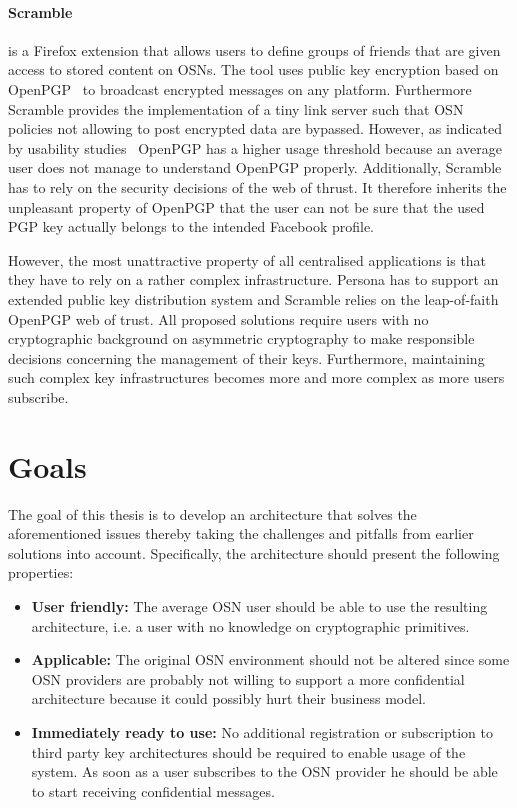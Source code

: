 \paragraph{Scramble~\cite{art:BeatoKW11}} is a Firefox extension that allows users to define groups of friends that are given access to stored content on OSNs. The tool uses public key encryption based on OpenPGP~\cite{rfc4880} to broadcast encrypted messages on any platform. Furthermore Scramble provides the implementation of a tiny link server such that OSN policies not allowing to post encrypted data are bypassed. However, as indicated by usability studies~\cite{art:WhittenT99} OpenPGP has a higher usage threshold because an average user does not manage to understand OpenPGP properly. Additionally, Scramble has to rely on the security decisions of the web of thrust. It therefore inherits the unpleasant property of OpenPGP that the user can not be sure that the used PGP key actually belongs to the intended Facebook profile.

However, the most unattractive property of all centralised applications is that they have to rely on a rather complex infrastructure. Persona has to support an extended public key distribution system and Scramble relies on the leap-of-faith OpenPGP web of trust. All proposed solutions require users with no cryptographic background on asymmetric cryptography to make responsible decisions concerning the management of their keys. Furthermore, maintaining such complex key infrastructures becomes more and more complex as more users subscribe.

\section{Goals}
\label{sec:goals_of_this_thesis}
The goal of this thesis is to develop an architecture that solves the aforementioned issues thereby taking the challenges and pitfalls from earlier solutions into account. Specifically, the architecture should present the following properties:
\begin{itemize}
 \item \textbf{User friendly:} The average OSN user should be able to use the resulting architecture, i.e. a user with no knowledge on cryptographic primitives.
 \item \textbf{Applicable:} The original OSN environment should not be altered since some OSN providers are probably not willing to support a more confidential architecture because it could possibly hurt their business model.
 \item \textbf{Immediately ready to use:} No additional registration or subscription to third party key architectures should be required to enable usage of the system. As soon as a user subscribes to the OSN provider he should be able to start receiving confidential messages.
\end{itemize}

